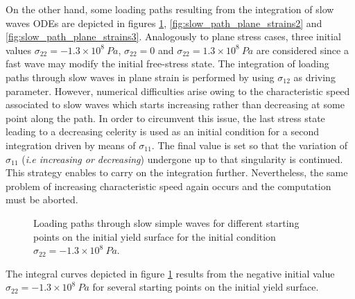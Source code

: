 On the other hand, some loading paths resulting from the integration of slow waves ODEs are depicted in figures \ref{fig:slow_path_plane_strains1}, \ref{fig:slow_path_plane_strains2} and \ref{fig:slow_path_plane_strains3}.
Analogously to plane stress cases, three initial values $\sigma_{22}=-1.3 \times 10^{8} \: Pa$, $\sigma_{22}=0$ and $\sigma_{22}=1.3 \times 10^8 \: Pa$ are considered since a fast wave may modify the initial free-stress state.
The integration of loading paths through slow waves in plane strain is performed by using $\sigma_{12}$ as driving parameter.
However, numerical difficulties arise owing to the characteristic speed associated to slow waves which starts increasing rather than decreasing at some point along the path.
In order to circumvent this issue, the last stress state leading to a decreasing celerity is used as an initial condition for a second integration driven by means of $\sigma_{11}$.
The final value is set so that the variation of $\sigma_{11}$ (\textit{i.e increasing or decreasing}) undergone up to that singularity is continued.
This strategy enables to carry on the integration further.
Nevertheless, the same problem of increasing characteristic speed again occurs and the computation must be aborted.
\begin{figure}[h!]
  \centering
  \caption{Loading paths through slow simple waves for different starting points on the initial yield surface for the initial condition $\sigma_{22}=-1.3 \times 10^{8} \: Pa$.}
  \label{fig:slow_path_plane_strains1}
\end{figure}
The integral curves depicted in figure \ref{fig:slow_path_plane_strains1} results from the negative initial value $\sigma_{22}=-1.3 \times 10^{8} \: Pa$ for several starting points on the initial yield surface.

